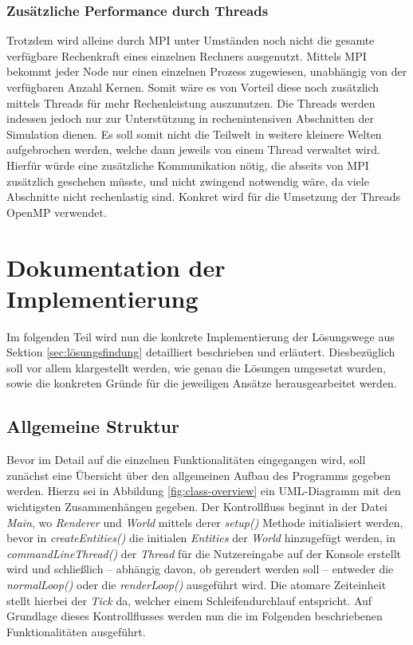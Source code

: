 \documentclass[course=erap]{aspdoc}
\begin{document}
\subsubsection{Zusätzliche Performance durch Threads}
Trotzdem wird alleine durch MPI unter Umständen noch nicht die gesamte verfügbare Rechenkraft eines einzelnen Rechners ausgenutzt. Mittels MPI bekommt jeder Node nur einen einzelnen Prozess zugewiesen, unabhängig von der verfügbaren Anzahl Kernen. Somit wäre es von Vorteil diese noch zusätzlich mittels Threads für mehr Rechenleistung auszunutzen. Die Threads werden indessen jedoch nur zur Unterstützung in rechenintensiven Abschnitten der Simulation dienen. Es soll somit nicht die Teilwelt in weitere kleinere Welten aufgebrochen werden, welche dann jeweils von einem Thread verwaltet wird. Hierfür würde eine zusätzliche Kommunikation nötig, die abseits von MPI zusätzlich geschehen müsste, und nicht zwingend notwendig wäre, da viele Abschnitte nicht rechenlastig sind. Konkret wird für die Umsetzung der Threads OpenMP verwendet.


\section{Dokumentation der Implementierung}
\label{sec:documentation}
Im folgenden Teil wird nun die konkrete Implementierung der Lösungswege aus Sektion \ref{sec:lösungsfindung} detailliert beschrieben und erläutert. Diesbezüglich soll vor allem klargestellt werden, wie genau die Lösungen umgesetzt wurden, sowie die konkreten Gründe für die jeweiligen Ansätze herausgearbeitet werden.

\subsection{Allgemeine Struktur}

Bevor im Detail auf die einzelnen Funktionalitäten eingegangen wird, soll zunächst eine Übersicht über den allgemeinen Aufbau des Programms gegeben werden.
Hierzu sei in Abbildung \ref{fig:class-overview} ein UML-Diagramm mit den wichtigsten Zusammenhängen gegeben. Der Kontrollfluss beginnt in der Datei \emph{Main}, wo \emph{Renderer} und \emph{World} mittels derer \emph{setup()} Methode initialisiert werden, bevor in \emph{createEntities()} die initialen \emph{Entities} der \emph{World} hinzugefügt werden, in \emph{commandLineThread()} der \emph{Thread} für die Nutzereingabe auf der Konsole erstellt wird und schließlich -- abhängig davon, ob gerendert werden soll -- entweder die \emph{normalLoop()} oder die \emph{renderLoop()} ausgeführt wird. Die atomare Zeiteinheit stellt hierbei der \emph{Tick} da, welcher einem Schleifendurchlauf entspricht. Auf Grundlage dieses Kontrollflusses werden nun die im Folgenden beschriebenen Funktionalitäten ausgeführt.
\end{document}
